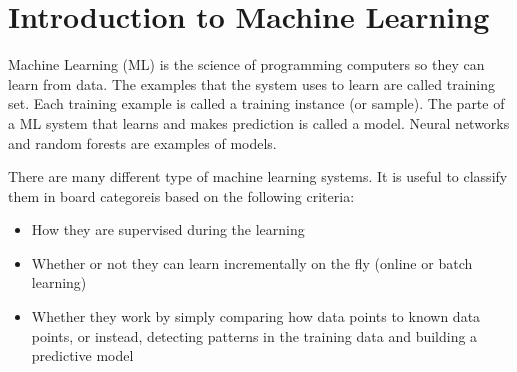 \chapter{Introduction to Machine Learning}
Machine Learning (ML) is the science of programming computers so they can learn from data. The examples that the system uses to learn are called
training set. Each training example is called a training instance (or sample). The parte of a ML system that learns and makes prediction is called a model.
Neural networks and random forests are examples of models.

There are many different type of machine learning systems. It is useful to classify them in board categoreis based on the following criteria:
\begin{itemize}
    \item How they are supervised during the learning
    \item Whether or not they can learn incrementally on the fly (online or batch learning)
    \item Whether they work by simply comparing how data points to known data points, or instead, detecting patterns in the training data and building a predictive model
\end{itemize}





